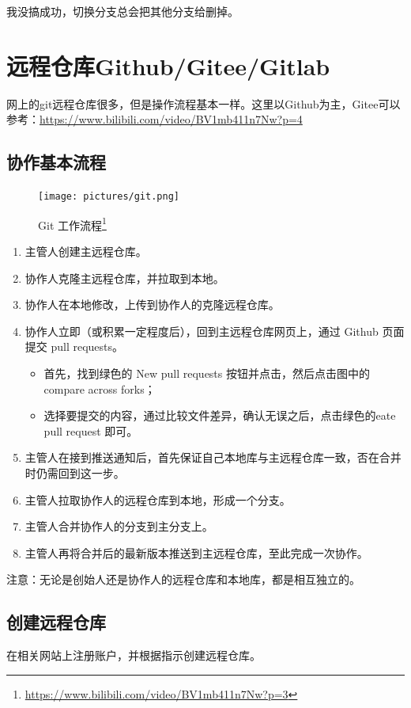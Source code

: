 {\color{red} 我没搞成功，切换分支总会把其他分支给删掉。}




\section{远程仓库Github/Gitee/Gitlab}
网上的git远程仓库很多，但是操作流程基本一样。这里以Github为主，Gitee可以参考：\url{https://www.bilibili.com/video/BV1mb411n7Nw?p=4}


\subsection{协作基本流程}
\begin{figure}[h!]
\centering
\texttt{[image: pictures/git.png]}
\caption{Git 工作流程\footnote{\url{https://www.bilibili.com/video/BV1mb411n7Nw?p=3}}}
\end{figure}

\begin{enumerate}
\item  主管人创建主远程仓库。
\item 协作人克隆主远程仓库，并拉取到本地。
\item 协作人在本地修改，上传到协作人的克隆远程仓库。
\item 协作人立即（或积累一定程度后），回到主远程仓库网页上，通过 Github 页面提交 pull requests。
\begin{itemize}
\item 首先，找到绿色的 New pull requests 按钮并点击，然后点击图中的 compare across forks；
\item 选择要提交的内容，通过比较文件差异，确认无误之后，点击绿色的eate pull request 即可。
\end{itemize}
\item 主管人在接到推送通知后，首先保证自己本地库与主远程仓库一致，否在合并时仍需回到这一步。
\item 主管人拉取协作人的远程仓库到本地，形成一个分支。
\item 主管人合并协作人的分支到主分支上。
\item 主管人再将合并后的最新版本推送到主远程仓库，至此完成一次协作。
\end{enumerate}
注意：无论是创始人还是协作人的远程仓库和本地库，都是相互独立的。


\subsection{创建远程仓库}
在相关网站上注册账户，并根据指示创建远程仓库。



